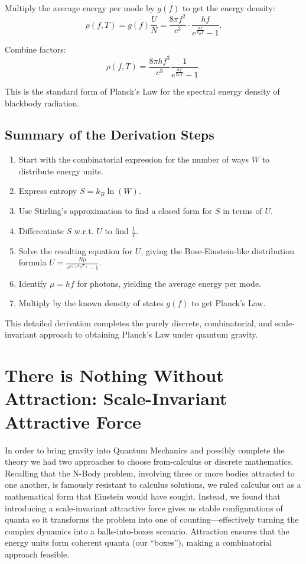 \documentclass{report}
\begin{document}
Multiply the average energy per mode by $g(f)$ to get the energy density:
\[
\rho(f,T) = g(f)\frac{U}{N} = \frac{8\pi f^2}{c^3} \cdot \frac{hf}{e^{\frac{hf}{k_B T}} - 1}.
\]

Combine factors:
\[
\rho(f,T) = \frac{8\pi h f^3}{c^3}\frac{1}{e^{\frac{hf}{k_B T}} - 1}.
\]

This is the standard form of Planck’s Law for the spectral energy density of blackbody radiation.


\subsection*{Summary of the Derivation Steps}

\begin{enumerate}
    \item Start with the combinatorial expression for the number of ways $W$ to distribute energy units.
    \item Express entropy $S = k_B\ln(W)$.
    \item Use Stirling’s approximation to find a closed form for $S$ in terms of $U$.
    \item Differentiate $S$ w.r.t. $U$ to find $\frac{1}{T}$.
    \item Solve the resulting equation for $U$, giving the Bose-Einstein-like distribution formula $U = \frac{N\mu}{e^{\mu/(k_B T)}-1}$.
    \item Identify $\mu = hf$ for photons, yielding the average energy per mode.
    \item Multiply by the known density of states $g(f)$ to get Planck’s Law.
\end{enumerate}

This detailed derivation completes the purely discrete, combinatorial, and scale-invariant approach to obtaining Planck’s Law under quantum gravity.




\section*{There is Nothing Without Attraction: Scale-Invariant Attractive Force}

In order to bring gravity into Quantum Mechanics and possibly complete the theory we had two approaches to choose from-calculus or discrete mathematics. Recalling that the N-Body problem, involving three or more bodies attracted to one another, is famously resistant to calculus solutions, we ruled calculus out as a mathematical form that Einstein would have sought. Instead, we found that introducing a scale-invariant attractive force gives us stable configurations of quanta so it transforms the problem into one of counting—effectively turning the complex dynamics into a balls-into-boxes scenario. Attraction ensures that the energy units form coherent quanta (our “boxes”), making a combinatorial approach feasible.
\end{document}
